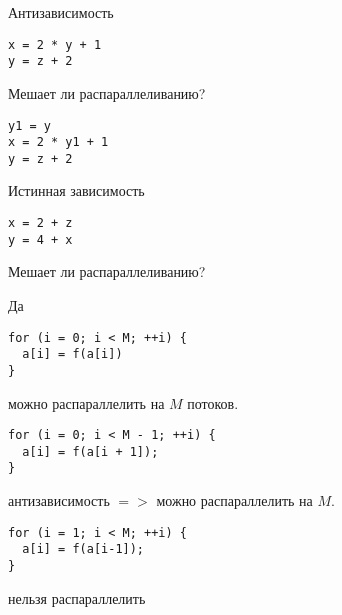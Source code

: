 \begin{frame}[fragile]{Антизависимость}
\begin{lstlisting}
x = 2 * y + 1
y = z + 2
\end{lstlisting}

Мешает ли распараллеливанию?

\pause

\begin{lstlisting}
y1 = y
x = 2 * y1 + 1
y = z + 2
\end{lstlisting}
\end{frame}

\begin{frame}[fragile]{Истинная зависимость}
\begin{lstlisting}
x = 2 + z
y = 4 + x
\end{lstlisting}

\pause\bigskip

Мешает ли распараллеливанию?

\pause\bigskip

Да
\end{frame}

\begin{frame}[fragile]

\begin{lstlisting}
for (i = 0; i < M; ++i) {
  a[i] = f(a[i])
}
\end{lstlisting}

можно распараллелить на $M$ потоков.

\end{frame}

\begin{frame}[fragile]

\begin{lstlisting}
for (i = 0; i < M - 1; ++i) {
  a[i] = f(a[i + 1]);
}
\end{lstlisting}

антизависимость $=>$ можно распараллелить на $M$.

\end{frame}

\begin{frame}[fragile]

\begin{lstlisting}
for (i = 1; i < M; ++i) {
  a[i] = f(a[i-1]);
}
\end{lstlisting}

нельзя распараллелить

\end{frame}

